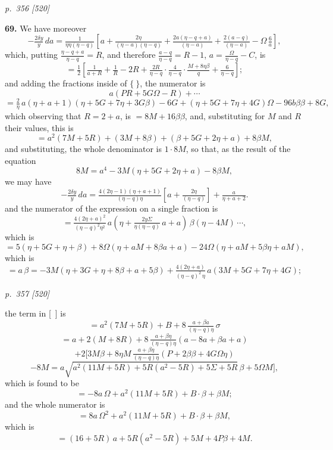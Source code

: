 \documentclass[11pt,a4paper]{book}
\begin{document}
\clearpage

\bigskip
\textit{p.~356 [520]}
\smallskip

\textbf{69.} We have moreover
\[
-\tfrac{2\delta y}{y}\,da = \tfrac{1}{\eta\eta(\eta - q)}\!\left[a + \tfrac{2\eta}{(\eta - a)(\eta - q)} + \tfrac{2a(\eta - q + a)}{(\eta - a)} + \tfrac{2(a - q)}{(\eta - a)} - \Omega\,\tfrac{6}{a}\right],
\]
which, putting $\tfrac{\eta - q + a}{\eta - q} = R$, and therefore $\tfrac{a - q}{\eta - q} = R - 1$, $a = \tfrac{\Omega}{\eta - q} - C$, is
\[
= \tfrac{1}{2}\!\left[\tfrac{1}{a + R} + \tfrac{1}{R} - 2R + \tfrac{2R}{\eta - q}\cdot\tfrac{4}{\eta - q}\cdot\tfrac{M + 8\eta\beta}{q} + \tfrac{6}{\eta - q}\right];
\]
and adding the fractions inside of $\{\ \}$, the numerator is
\[
a(P R + 5G\Omega - R) + \cdots
\]
\[
= \tfrac{2}{\eta}\,a(\eta + a + 1)(\eta + 5G + 7\eta + 3G\beta) - 6G + (\eta + 5G + 7\eta + 4G)\Omega - 96b\beta\beta + 8G,
\]
which observing that $R = 2 + a$, is $= 8M + 16\beta\beta$,
and, substituting for $M$ and $R$ their values, this is
\[
= a^2(7M + 5R) + (3M + 8\beta) + (\beta + 5G + 2\eta + a) + 8\beta M,
\]
and substituting, the whole denominator is $1 \cdot 8M$, so that, as the result of the equation
\[
8M = a^4 - 3M(\eta + 5G + 2\eta + a) - 8\beta M,
\]
we may have
\[
-\tfrac{2\delta y}{y}\,da = \tfrac{4(2\eta - 1)(\eta + a + 1)}{(\eta - q)\eta}\!\left[a + \tfrac{2\eta}{(\eta - q)}\right] + \tfrac{a}{\eta + a + 2}.
\]
and the numerator of the expression on a single fraction is
\[
= \tfrac{4(2\eta + a)^2}{(\eta - q)^2 \eta^2}\,a(\eta + \tfrac{2y\Sigma}{\eta(\eta - q)}\,a + a)\,\beta(\eta - 4M)\,\cdots,
\]
which is
\[
= 5(\eta + 5G + \eta + \beta) + 8\Omega(\eta + a M + 8\beta a + a) - 24\Omega(\eta + a M + 5\beta\eta + a M),
\]
which is
\[
= a\,\beta = -3M(\eta + 3G + \eta + 8\beta + a + 5\beta) + \tfrac{4(2\eta + a)}{(\eta - q)^2\,\eta}\,a(3M + 5G + 7\eta + 4G);
\]

\clearpage

\bigskip
\textit{p.~357 [520]}
\smallskip

the term in [\ ] is
\[
= a^2(7M + 5R) + B + 8\,\tfrac{a + \beta a}{(\eta - q)\eta}\,\sigma
\]
\[
= a + 2(M + 8R) + 8\,\tfrac{a + \beta\eta}{(\eta - q)\eta}\!\left(a - 8a + \beta a + a\right)
\]
\[
+ 2[3M\beta + 8\eta M\,\tfrac{a + \beta\eta}{(\eta - q)\eta}\!\left(P + 2\beta\beta + 4G\Omega\eta\right)
\]
\[
- 8M = a\sqrt{a^2(11M + 5R) + 5R(a^2 - 5R) + 5\Sigma + 5R}\,\beta + 5\Omega M],
\]
which is found to be
\[
= -8a\,\Omega + a^2(11M + 5R) + B\cdot\beta + \beta M;
\]
and the whole numerator is
\[
= 8a\,\Omega^2 + a^2(11M + 5R) + B\cdot\beta + \beta M,
\]
which is
\[
= (16 + 5R)\,a + 5R(a^2 - 5R) + 5M + 4P\beta + 4M.
\]
\end{document}
